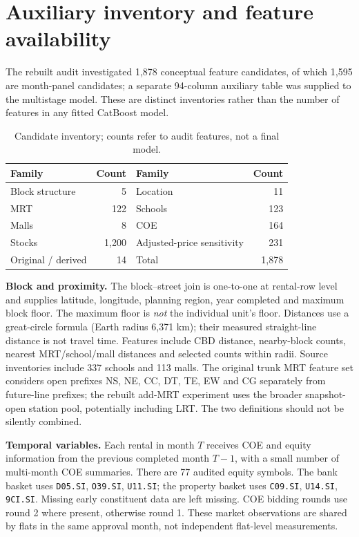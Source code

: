 \documentclass[10pt,a4paper]{article}
\begin{document}
\section{Auxiliary inventory and feature availability}\label{app:aux}
The rebuilt audit investigated 1,878 conceptual feature candidates, of which 1,595 are month-panel candidates; a separate 94-column auxiliary table was supplied to the multistage model. These are distinct inventories rather than the number of features in any fitted CatBoost model.
\begin{table}[htbp]\centering\small
\caption{Candidate inventory; counts refer to audit features, not a final model.}\label{tab:feature-families-short}
\begin{tabular}{lr@{\qquad}lr}\toprule Family & Count & Family & Count\\\midrule
Block structure & 5 & Location & 11\\
MRT & 122 & Schools & 123\\
Malls & 8 & COE & 164\\
Stocks & 1,200 & Adjusted-price sensitivity & 231\\
Original / derived & 14 & Total & 1,878\\\bottomrule\end{tabular}\end{table}

\textbf{Block and proximity.} The block--street join is one-to-one at rental-row level and supplies latitude, longitude, planning region, year completed and maximum block floor. The maximum floor is \emph{not} the individual unit's floor. Distances use a great-circle formula (Earth radius 6,371 km); their measured straight-line distance is not travel time. Features include CBD distance, nearby-block counts, nearest MRT/school/mall distances and selected counts within radii. Source inventories include 337 schools and 113 malls. The original trunk MRT feature set considers open prefixes NS, NE, CC, DT, TE, EW and CG separately from future-line prefixes; the rebuilt add-MRT experiment uses the broader snapshot-open station pool, potentially including LRT. The two definitions should not be silently combined.

\textbf{Temporal variables.} Each rental in month $T$ receives COE and equity information from the previous completed month $T-1$, with a small number of multi-month COE summaries. There are 77 audited equity symbols. The bank basket uses \texttt{D05.SI}, \texttt{O39.SI}, \texttt{U11.SI}; the property basket uses \texttt{C09.SI}, \texttt{U14.SI}, \texttt{9CI.SI}. Missing early constituent data are left missing. COE bidding rounds use round 2 where present, otherwise round 1. These market observations are shared by flats in the same approval month, not independent flat-level measurements.
\end{document}
